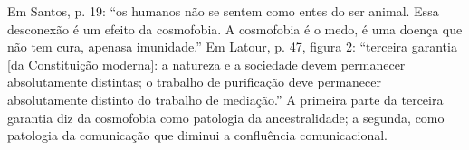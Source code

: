 Em Santos, p. 19: \enquote{os humanos não se sentem como entes do ser animal. Essa desconexão é um efeito da cosmofobia. A cosmofobia é o medo, é uma doença que não tem cura, apenasa imunidade.}
Em Latour, p. 47, figura 2: \enquote{terceira garantia [da Constituição moderna]: a natureza e a sociedade devem permanecer absolutamente distintas; o trabalho de purificação deve permanecer absolutamente distinto do trabalho de mediação.}
A primeira parte da terceira garantia diz da cosmofobia como patologia da ancestralidade; a segunda, como patologia da comunicação que diminui a confluência comunicacional.
